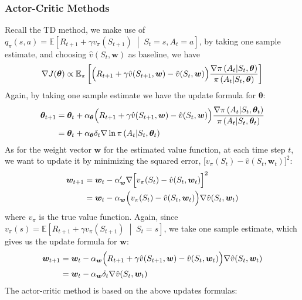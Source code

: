 \documentclass[11pt]{article}
\begin{document}
\subsubsection{Actor-Critic Methods}
Recall the TD method, we make use of 
\(q_\pi(s,a)=\mathbb{E}\left[R_{t+1}+\gamma v_\pi(S_{t+1})\;\middle|\;
S_t=s, A_t=a\right]\), by taking one sample estimate, and choosing
\(\hat{v}(S_t, \bm{w})\) as baseline, we have
\[\nabla J(\bm{\theta})\propto\mathbb{E}_\pi\left[
        \Bigl(R_{t+1}+\gamma \hat{v}(S_{t+1}, \bm{w})-\hat{v}(S_t, \bm{w})\Big)
        \frac{\nabla\pi\left(A_t\middle|S_t, \bm{\theta}\right)}
{\pi\left(A_t\middle|S_t, \bm{\theta}\right)}\right]\]
Again, by taking one sample estimate we have the update formula for 
\(\bm{\theta}\):
\begin{align*}
    \bm{\theta}_{t+1}
    &=\bm{\theta}_t + \alpha_{\bm{\theta}}
    \Bigl(R_{t+1}+\gamma \hat{v}(S_{t+1}, \bm{w})-\hat{v}(S_t, \bm{w})\Big)
    \frac{\nabla\pi\left(A_t\middle|S_t, \bm{\theta}_t\right)}
    {\pi\left(A_t\middle|S_t, \bm{\theta}_t\right)}\\
    &=\bm{\theta}_t+\alpha_{\bm{\theta}}\delta_t
    \nabla\ln{\pi\left(A_t\middle|S_t, \bm{\theta}_t\right)}
\end{align*}
As for the weight vector \(\bm{w}\) for the estimated value function, at each 
time step \(t\), we want to update it by minimizing the squared error,
\(\bigl[v_\pi(S_t)-\hat{v}(S_t, \bm{w}_t)\bigr]^2\):
\begin{align*}
    \bm{w}_{t+1} 
    &= \bm{w}_t - 
    \alpha_{\bm{w}}'\nabla \Bigl[v_\pi(S_t)-\hat{v}(S_t, \bm{w}_t)\Bigr]^2\\
    &= \bm{w}_t - \alpha_{\bm{w}}\Bigl(v_\pi(S_t)-\hat{v}(S_t, \bm{w}_t)
    \Bigr)\nabla \hat{v}(S_t, \bm{w}_t)
\end{align*}
where \(v_\pi\) is the true value function. Again, since \(v_\pi(s)=
\mathbb{E}\left[R_{t+1}+\gamma v_\pi(S_{t+1})\;\middle|\;S_t=s\right]\), we
take one sample estimate, which gives us the update formula for \(\bm{w}\):
\begin{align*}
    \bm{w}_{t+1} 
    &= \bm{w}_t - \alpha_{\bm{w}}
    \Bigl(R_{t+1}+\gamma\hat{v}(S_{t+1},\bm{w})-\hat{v}(S_t, \bm{w}_t)
    \Bigr)\nabla \hat{v}(S_t, \bm{w}_t)\\
    &=\bm{w}_t - \alpha_{\bm{w}}\delta_t\nabla \hat{v}(S_t, \bm{w}_t)
\end{align*}
The actor-critic method is based on the above updates formulas:
\end{document}
